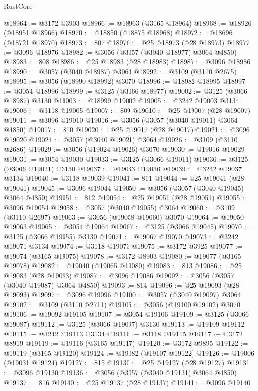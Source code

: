\begin{lexlean}{RustCore}
\begin{coremodule}
@18964 := @3172 @3903
@18966 := @18963 (@3165 @18964)
@18968 := @18926 (@18951 @18966)
@18970 := @18850 (@18875 @18968)
@18972 := @18696 (@18721 @18970)
@18973 := 807
@18976 := @25 @18973 (@28 @18973)
@18977 := @3096 @18976
@18982 := @3056 (@3057 (@3040 @18977) @3064 @4850)
@18983 := 808
@18986 := @25 @18983 (@28 @18983)
@18987 := @3096 @18986
@18990 := @3057 (@3040 @18987) @3064
@18992 := @3109 (@3110 @2675)
@18995 := @3056 (@18990 @18992) @3070
@18996 := @18982 @18995
@18997 := @3054 @18996
@18999 := @3125 (@3066 @18977)
@19002 := @3125 (@3066 @18987) @3130
@19003 := @18999 @19002
@19005 := @3242 @19003 @3134
@19006 := @3118 @19005
@19007 := 809
@19010 := @25 @19007 (@28 @19007)
@19011 := @3096 @19010
@19016 := @3056 (@3057 (@3040 @19011) @3064 @4850)
@19017 := 810
@19020 := @25 @19017 (@28 @19017)
@19021 := @3096 @19020
@19024 := @3057 (@3040 @19021) @3064
@19026 := @3109 (@3110 @2686)
@19029 := @3056 (@19024 @19026) @3070
@19030 := @19016 @19029
@19031 := @3054 @19030
@19033 := @3125 (@3066 @19011)
@19036 := @3125 (@3066 @19021) @3130
@19037 := @19033 @19036
@19039 := @3242 @19037 @3134
@19040 := @3118 @19039
@19041 := 811
@19044 := @25 @19041 (@28 @19041)
@19045 := @3096 @19044
@19050 := @3056 (@3057 (@3040 @19045) @3064 @4850)
@19051 := 812
@19054 := @25 @19051 (@28 @19051)
@19055 := @3096 @19054
@19058 := @3057 (@3040 @19055) @3064
@19060 := @3109 (@3110 @2697)
@19063 := @3056 (@19058 @19060) @3070
@19064 := @19050 @19063
@19065 := @3054 @19064
@19067 := @3125 (@3066 @19045)
@19070 := @3125 (@3066 @19055) @3130
@19071 := @19067 @19070
@19073 := @3242 @19071 @3134
@19074 := @3118 @19073
@19075 := @3172 @3925
@19077 := @19074 (@3165 @19075)
@19078 := @3172 @8903
@19080 := @19077 (@3165 @19078)
@19082 := @19040 (@19065 @19080)
@19083 := 813
@19086 := @25 @19083 (@28 @19083)
@19087 := @3096 @19086
@19092 := @3056 (@3057 (@3040 @19087) @3064 @4850)
@19093 := 814
@19096 := @25 @19093 (@28 @19093)
@19097 := @3096 @19096
@19100 := @3057 (@3040 @19097) @3064
@19102 := @3109 (@3110 @2711)
@19105 := @3056 (@19100 @19102) @3070
@19106 := @19092 @19105
@19107 := @3054 @19106
@19109 := @3125 (@3066 @19087)
@19112 := @3125 (@3066 @19097) @3130
@19113 := @19109 @19112
@19115 := @3242 @19113 @3134
@19116 := @3118 @19115
@19117 := @3172 @8919
@19119 := @19116 (@3165 @19117)
@19120 := @3172 @9895
@19122 := @19119 (@3165 @19120)
@19124 := @19082 (@19107 @19122)
@19126 := @19006 (@19031 @19124)
@19127 := 815
@19130 := @25 @19127 (@28 @19127)
@19131 := @3096 @19130
@19136 := @3056 (@3057 (@3040 @19131) @3064 @4850)
@19137 := 816
@19140 := @25 @19137 (@28 @19137)
@19141 := @3096 @19140

\end{coremodule}
\end{lexlean}
